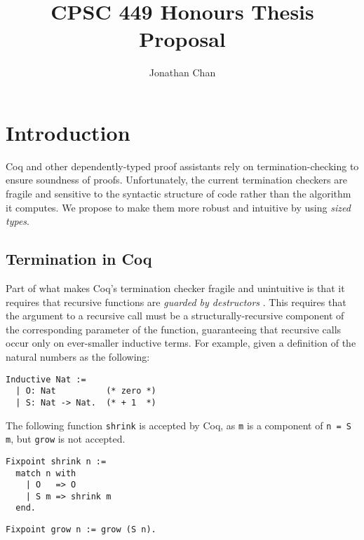 \documentclass{article}
\title{CPSC 449 Honours Thesis Proposal}
\author{Jonathan Chan}
\date{}
\begin{document}
\maketitle

\section{Introduction}
Coq and other dependently-typed proof assistants rely on termination-checking to ensure soundness of proofs. Unfortunately, the current termination checkers are fragile and sensitive to the syntactic structure of code rather than the algorithm it computes. We propose to make them more robust and intuitive by using \textit{sized types}.

\subsection{Termination in Coq} \label{coq-termination}
Part of what makes Coq's termination checker fragile and unintuitive is that it requires that recursive functions are \textit{guarded by destructors} \cite{gimenez}. This requires that the argument to a recursive call must be a structurally-recursive component of the corresponding parameter of the function, guaranteeing that recursive calls occur only on ever-smaller inductive terms. For example, given a definition of the natural numbers as the following:

\begin{verbatim}
Inductive Nat :=
  | O: Nat          (* zero *)
  | S: Nat -> Nat.  (* + 1  *)
\end{verbatim}

The following function \texttt{shrink} is accepted by Coq, as \texttt{m} is a component of \texttt{n = S m}, but \texttt{grow} is not accepted.

\begin{multicols}{2}
\begin{verbatim}
Fixpoint shrink n :=
  match n with
    | O   => O
    | S m => shrink m
  end.
\end{verbatim}

\begin{verbatim}
Fixpoint grow n := grow (S n).
\end{verbatim}

\begin{verbatim}


\end{verbatim}
\end{multicols}
\end{document}
